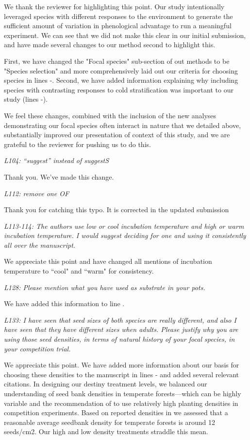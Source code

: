 \documentclass[11pt]{article}
\begin{document}
We thank the reviewer for highlighting this point. Our study intentionally leveraged species with different responses to the environment to generate the sufficient amount of variation in phenological advantage to run a meaningful experiment. We can see that we did not make this clear in our initial submission, and have made several changes to our method second to highlight this.

First, we have changed the "Focal species" sub-section of out methods to be "Species selection" and more comprehensively laid out our criteria for choosing species in lines -. Second, we have added information explaining why including species with contrasting responses to cold stratification  was important to our study (lines -).

We feel these changes, combined with the inclusion of the new analyses demonstrating our focal species often interact in nature that we detailed above, substantially improved our presentation of context of this study, and we are grateful to the reviewer for pushing us to do this.

\emph{L104: “suggest” instead of suggestS}

Thank you. We've made this change.

\emph{L112: remove one OF}

Thank you for catching this typo. It is corrected in the updated submission

\emph{L113-114: The authors use low or cool incubation temperature and high or warm incubation temperature. I would suggest deciding for one and using it consistently all over the manuscript.}

We appreciate this point and have changed all mentions of incubation temperature to ``cool" and ``warm" for consistency. 

\emph{L128: Please mention what you have used as substrate in your pots.}

We have added this information to line . 

\emph{L133: I have seen that seed sizes of both species are really different, and also I have seen that they have different sizes when adults. Please justify why you are using those seed densities, in terms of natural history of your focal species, in your competition trial.}

We appreciate this point. We have added more information about our basis for choosing these densities to the manuscript in lines - and added several relevant citations. In designing our destiny treatment levels, we balanced our understanding of seed bank densities in temperate forests---which can be highly variable \citep{Leckie:2000tb,Bossuyt:2002un,Decocq:2004tq} and the recommendation of \citet{Inouye2001} to use relatively high planting densities in competition experiments. Based on reported densities in \citet{Leckie:2000tb,Bossuyt:2002un,Decocq:2004tq} we assessed that a reasonable average seedbank density for temperate forests is around 12 seeds/cm2. Our high and low density treatments straddle this mean.
\end{document}
